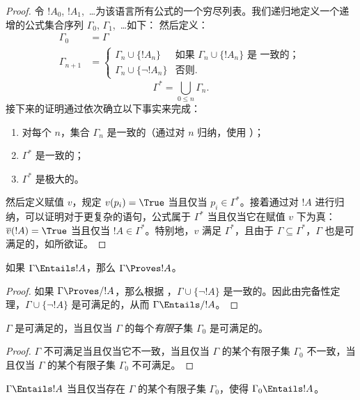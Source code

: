 \documentclass[../../../include/open-logic-section]{subfiles}
\begin{document}
\begin{proof}
令 $!A_0$, $!A_1$,~\dots 为该语言所有公式的一个穷尽列表。我们递归地定义一个递增的公式集合序列 $\Gamma_0$, $\Gamma_1$,~\dots 如下：
然后定义：
\begin{align*}
\Gamma_0 & = \Gamma\\
\Gamma_{n+1} &  =
\begin{cases}
  \Gamma_n \cup \{!A_n\} & \text{如果 $\Gamma_n \cup \{!A_n\}$ 是
    一致的；}\\
  \Gamma_n \cup \{\lnot !A_n\} & \text{否则}.
\end{cases}
\end{align*}
\[
\Gamma^* = \bigcup_{0\le n}\Gamma_n.
\]
接下来的证明通过依次确立以下事实来完成：
\begin{enumerate}
\item 对每个 $n$，集合 $\Gamma_n$ 是一致的（通过对 $n$ 归纳，使用 ）；
\item $\Gamma^*$ 是一致的；
\item $\Gamma^*$ 是极大的。
\end{enumerate}
然后定义赋值 $v$，规定 $v(p_i) = \True$ 当且仅当 $p_i \in \Gamma^*$。接着通过对 $!A$ 进行归纳，可以证明对于更复杂的语句，公式属于 $\Gamma^*$ 当且仅当它在赋值 $v$ 下为真：$\overline{v}(!A) = \True$ 当且仅当 $!A \in \Gamma^*$。特别地，$v$ 满足 $\Gamma^*$，且由于 $\Gamma \subseteq \Gamma^*$，$\Gamma$ 也是可满足的，如所欲证。
\end{proof}

\begin{cor}
如果 $\Gamma \Entails !A$，那么 $\Gamma \Proves !A$。
\end{cor}

\begin{proof}
如果 $\Gamma\Proves/ !A$，那么根据 ，$\Gamma \cup \{\lnot !A\}$ 是一致的。因此由完备性定理，$\Gamma \cup \{\lnot !A\}$ 是可满足的，从而 $\Gamma \Entails/ !A$。
\end{proof}

\begin{prop}[紧致性定理]
$\Gamma$ 是可满足的，当且仅当 $\Gamma$ 的每个\emph{有限}子集 $\Gamma_0$ 是可满足的。
\end{prop}

\begin{proof}
$\Gamma$ 不可满足当且仅当它不一致，当且仅当 $\Gamma$ 的某个有限子集 $\Gamma_0$ 不一致，当且仅当 $\Gamma$ 的某个有限子集 $\Gamma_0$ 不可满足。
\end{proof}

\begin{cor}
$\Gamma \Entails !A$ 当且仅当存在 $\Gamma$ 的某个有限子集 $\Gamma_0$，使得 $\Gamma_0 \Entails !A$。
\end{cor}
\end{document}
